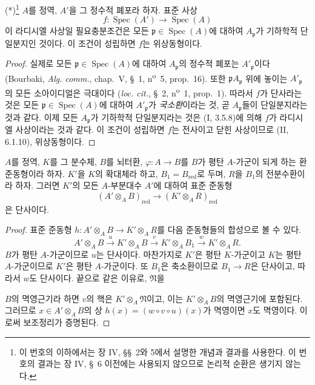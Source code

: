 \begin{lemma}[23.2.2]
\label{0.23.2.2-ko}
\textnormal{(*)}\footnote{이 번호의 이하에서는 장 IV, §§~2와 5에서
설명한 개념과 결과를 사용한다. 이 번호의 결과는 장 IV, §~6 이전에는
사용되지 않으므로 논리적 순환은 생기지 않는다.}
$A$를 정역, $A'$을 그 정수적 폐포라 하자. 표준 사상
\[
  f:\operatorname{Spec}(A')\longrightarrow\operatorname{Spec}(A)
\]
이 라디시엘 사상일 필요충분조건은 모든
$\mathfrak p\in\operatorname{Spec}(A)$에 대하여
$A_{\mathfrak p}$가 기하학적 단일분지인 것이다. 이 조건이 성립하면
$f$는 위상동형이다.
\end{lemma}

\begin{proof}
실제로 모든 $\mathfrak p\in\operatorname{Spec}(A)$에 대하여
$A_{\mathfrak p}$의 정수적 폐포는 $A'_{\mathfrak p}$이다
(Bourbaki, \emph{Alg. comm.}, chap.~V, §~1,
n\textsuperscript{o}~5, prop.~16). 또한
$\mathfrak pA_{\mathfrak p}$ 위에 놓이는
$A'_{\mathfrak p}$의 모든 소아이디얼은 극대이다
(\emph{loc. cit.}, §~2, n\textsuperscript{o}~1, prop.~1).
따라서 $f$가 단사라는 것은 모든
$\mathfrak p\in\operatorname{Spec}(A)$에 대하여
$A'_{\mathfrak p}$가 \emph{국소환}이라는 것, 곧
$A_{\mathfrak p}$들이 단일분지라는 것과 같다. 이제 모든
$A_{\mathfrak p}$가 기하학적 단일분지라는 것은 (I, 3.5.8)에 의해
$f$가 라디시엘 사상이라는 것과 같다. 이 조건이 성립하면 $f$는
전사이고 닫힌 사상이므로 (II, 6.1.10), 위상동형이다.
\end{proof}

\begin{lemma}[23.2.3]
\label{0.23.2.3-ko}
$A$를 정역, $K$를 그 분수체, $B$를 뇌터환,
$\varphi:A\to B$를 $B$가 평탄 $A$-가군이 되게 하는 환 준동형이라
하자. $K'$을 $K$의 확대체라 하고, $B_1=B_{\mathrm{red}}$로 두며,
$R$을 $B_1$의 전분수환이라 하자. 그러면 $K'$의 모든
$A$-부분대수 $A'$에 대하여 표준 준동형
\begin{equation}
\label{0.23.2.3.1-ko}
  (A'\otimes_AB)_{\mathrm{red}}
  \longrightarrow(K'\otimes_AR)_{\mathrm{red}}
  \tag{23.2.3.1}
\end{equation}
은 단사이다.
\end{lemma}

\begin{proof}
표준 준동형
$h:A'\otimes_AB\to K'\otimes_AR$를 다음 준동형들의 합성으로 볼 수
있다.
\[
  A'\otimes_AB\xrightarrow{u}K'\otimes_AB
  \xrightarrow{v}K'\otimes_AB_1\xrightarrow{w}K'\otimes_AR.
\]
$B$가 평탄 $A$-가군이므로 $u$는 단사이다. 마찬가지로 $K'$은
평탄 $K$-가군이고 $K$는 평탄 $A$-가군이므로 $K'$은 평탄
$A$-가군이다. 또 $B_1$은 축소환이므로 $B_1\to R$은 단사이고,
따라서 $w$도 단사이다. 끝으로 같은 이유로, $\mathfrak N$을


$B$의 멱영근기라 하면 $v$의 핵은 $K'\otimes_A\mathfrak N$이고,
이는 $K'\otimes_AB$의 멱영근기에 포함된다. 그러므로
$x\in A'\otimes_AB$의 상
$h(x)=(w\circ v\circ u)(x)$가 멱영이면 $x$도 멱영이다. 이로써
보조정리가 증명된다.
\end{proof}

